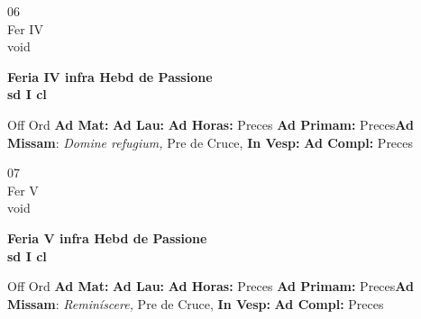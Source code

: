 \documentclass[10pt, openany]{book}
\begin{document}
    \begin{center}
        \begin{minipage}{3.5in}
            \vspace{2em}
            \begin{minipage}{0.5in}
                {\Huge 06} \\
                {\normalsize Fer IV} \\
                {\normalsize void}
            \end{minipage}
            \begin{minipage}{3.0in}
                \textbf{ \large Feria IV infra Hebd de Passione \\
                \textnormal{\normalsize sd I cl}} \\ 
            \end{minipage}
            \begin{justify}Off Ord
                \textbf{Ad Mat: }
                \textbf{Ad Lau: }
                \textbf{Ad Horas: }Preces
                \textbf{Ad Primam: }Preces\textbf{Ad Missam}: \textit{Domine refugium,} Pre de Cruce,  
                \textbf{In Vesp: }
                \textbf{Ad Compl: }Preces
            \end{justify}
        \end{minipage}
    \end{center}

    \begin{center}
        \begin{minipage}{3.5in}
            \vspace{2em}
            \begin{minipage}{0.5in}
                {\Huge 07} \\
                {\normalsize Fer V} \\
                {\normalsize void}
            \end{minipage}
            \begin{minipage}{3.0in}
                \textbf{ \large Feria V infra Hebd de Passione \\
                \textnormal{\normalsize sd I cl}} \\ 
            \end{minipage}
            \begin{justify}Off Ord
                \textbf{Ad Mat: }
                \textbf{Ad Lau: }
                \textbf{Ad Horas: }Preces
                \textbf{Ad Primam: }Preces\textbf{Ad Missam}: \textit{Reminíscere,} Pre de Cruce,  
                \textbf{In Vesp: }
                \textbf{Ad Compl: }Preces
            \end{justify}
        \end{minipage}
    \end{center}
\end{document}
